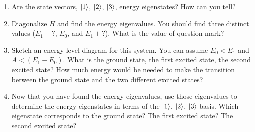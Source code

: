 \documentclass[
]{article}
\providecommand{\tightlist}{%
  \setlength{\itemsep}{0pt}\setlength{\parskip}{0pt}}
\providecommand{\tightlist}{%
  \setlength{\itemsep}{0pt}\setlength{\parskip}{0pt}}
\begin{document}
\begin{enumerate}
\def\labelenumi{\arabic{enumi}.}
\tightlist
\item
  Are the state vectors, \(\ket{1}\), \(\ket{2}\), \(\ket{3}\), energy
  eigenstates? How can you tell?
\item
  Diagonalize \(H\) and find the energy eigenvalues. You should find
  three distinct values (\(E_1 - ?\), \(E_0\), and \(E_1 + ?\)). What is
  the value of question mark?
\item
  Sketch an energy level diagram for this system. You can assume
  \(E_0 < E_1\) and \(A < (E_1-E_0)\). What is the ground state, the
  first excited state, the second excited state? How much energy would
  be needed to make the transition between the ground state and the two
  different excited states?
\item
  Now that you have found the energy eigenvalues, use those eigenvalues
  to determine the energy eigenstates in terms of the \(\ket{1}\),
  \(\ket{2}\), \(\ket{3}\) basis. Which eigenstate corresponds to the
  ground state? The first excited state? The second excited state?
\end{enumerate}
\end{document}
